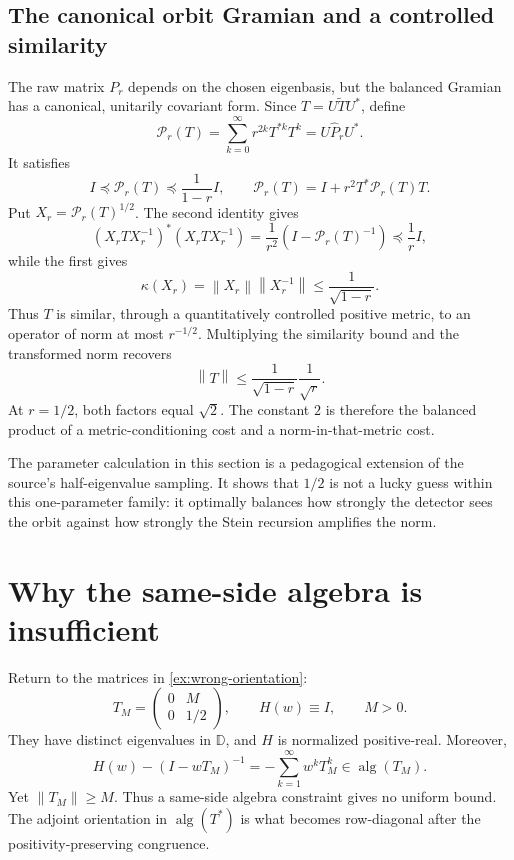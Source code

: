 \documentclass[11pt,oneside,openany]{book}
\theoremstyle{definition}
\theoremstyle{remark}
\newcommand{\D}{\mathbb D}
\newcommand{\alg}{\operatorname{alg}}
\newcommand{\norm}[1]{\left\lVert #1\right\rVert}
\begin{document}
\subsection*{The canonical orbit Gramian and a controlled similarity}

The raw matrix \(P_r\) depends on the chosen eigenbasis, but the
balanced Gramian has a canonical, unitarily covariant form.  Since
\(T=U\widetilde T U^*\), define
\begin{equation}
  \mathcal P_r(T)
  =
  \sum_{k=0}^{\infty}r^{2k}T^{*k}T^k
  =
  U\widehat P_rU^*.
  \label{eq:canonical-Pr}
\end{equation}
It satisfies
\begin{equation}
  I\preceq\mathcal P_r(T)\preceq\frac1{1-r}I,
  \qquad
  \mathcal P_r(T)
  =
  I+r^2T^*\mathcal P_r(T)T.
  \label{eq:canonical-Pr-bounds}
\end{equation}
Put \(X_r=\mathcal P_r(T)^{1/2}\).  The second identity gives
\[
  (X_rTX_r^{-1})^*(X_rTX_r^{-1})
  =
  \frac1{r^2}
  \left(I-\mathcal P_r(T)^{-1}\right)
  \preceq\frac1r I,
\]
while the first gives
\[
  \kappa(X_r)
  =\norm{X_r}\norm{X_r^{-1}}
  \leq\frac1{\sqrt{1-r}}.
\]
Thus \(T\) is similar, through a quantitatively controlled positive
metric, to an operator of norm at most \(r^{-1/2}\).  Multiplying the
similarity bound and the transformed norm recovers
\[
  \norm{T}
  \leq
  \frac1{\sqrt{1-r}}\frac1{\sqrt r}.
\]
At \(r=1/2\), both factors equal \(\sqrt2\).  The constant \(2\) is
therefore the balanced product of a metric-conditioning cost and a
norm-in-that-metric cost.

\begin{intuitionbox}
The parameter calculation in this section is a pedagogical extension
of the source's half-eigenvalue sampling.  It shows that \(1/2\) is not
a lucky guess within this one-parameter family: it optimally balances
how strongly the detector sees the orbit against how strongly the
Stein recursion amplifies the norm.
\end{intuitionbox}

\section{Why the same-side algebra is insufficient}

Return to the matrices in \cref{ex:wrong-orientation}:
\[
  T_M=\begin{pmatrix}0&M\\0&1/2\end{pmatrix},
  \qquad H(w)\equiv I,
  \qquad M>0.
\]
They have distinct eigenvalues in \(\D\), and \(H\) is normalized
positive-real.  Moreover,
\[
  H(w)-(I-wT_M)^{-1}
  =-\sum_{k=1}^{\infty}w^kT_M^k\in\alg(T_M).
\]
Yet \(\norm{T_M}\geq M\).  Thus a same-side algebra constraint gives
no uniform bound.  The adjoint orientation in
\(\alg(T^*)\) is what becomes row-diagonal after the positivity-preserving
congruence.
\end{document}
